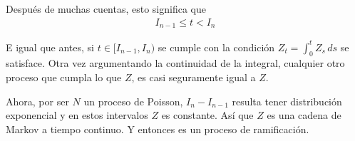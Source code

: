 Después de muchas cuentas, esto significa que
\begin{align}
         I_{n-1} \leq t < I_{n}
\end{align}\pn

E igual que antes, si $t \in [I_{n-1}, I_{n})$ se cumple con la condición $Z_t = \int_{0}^t Z_s \,ds$ se satisface. Otra vez
argumentando la continuidad de la integral, cualquier otro proceso que cumpla lo que $Z$, es casi seguramente igual a $Z$.\pn

Ahora, por ser $N$ un proceso de Poisson, $I_{n} - I_{n-1}$ resulta tener distribución exponencial y en estos intervalos
$Z$ es constante. Así que $Z$ es una cadena de Markov a tiempo continuo. Y entonces es un proceso de ramificación.